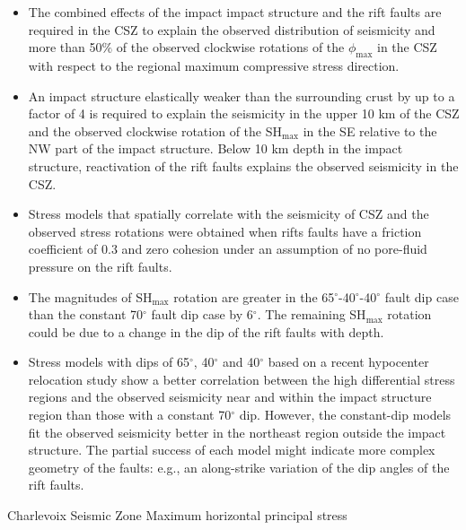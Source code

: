 \documentclass[draft]{agujournal2018}
\begin{document}
\begin{itemize}

\item The combined effects of the impact impact structure and the rift faults are required in the CSZ to explain the observed distribution of seismicity and more than 50$\%$ of the observed clockwise rotations of the $\phi_{\max}$ in the CSZ with respect to the regional maximum compressive stress direction.

\item An impact structure elastically weaker than the surrounding crust by up to a factor of 4 is required to explain the seismicity in the upper 10 km of the CSZ and the observed clockwise rotation of the SH$_{\max}$ in the SE relative to the NW part of the impact structure. Below 10 km depth in the impact structure, reactivation of the rift faults explains the observed seismicity in the CSZ.

\item Stress models that spatially correlate with the seismicity of CSZ and the observed stress rotations were obtained when rifts faults have a friction coefficient of 0.3 and zero cohesion under an assumption of no pore-fluid pressure on the rift faults.

\item The magnitudes of SH$_{\max}$ rotation are greater in the 65$^\circ$-40$^\circ$-40$^\circ$ fault dip case than the constant 70$^\circ$ fault dip case by 6$^\circ$. The remaining SH$_{\max}$ rotation could be due to a change in the dip of the rift faults with depth.

\item Stress models with dips of 65$^\circ$, 40$^\circ$ and 40$^\circ$ based on a recent hypocenter relocation study show a better correlation between the high differential stress regions and the observed seismicity near and within the impact structure region than those with a constant 70$^\circ$ dip. However, the constant-dip models fit the observed seismicity better in the northeast region outside the impact structure. The partial success of each model might indicate more complex geometry of the faults: e.g., an along-strike variation of the dip angles of the rift faults.
 
\end{itemize}


\begin{acronyms}
  Charlevoix Seismic Zone
  Maximum horizontal principal stress 
\end{acronyms}
\end{document}
